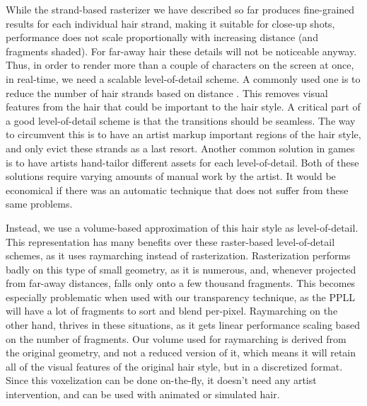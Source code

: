 \documentclass{egpubl}
\begin{document}
While the strand-based rasterizer we have described so far produces fine-grained results for each individual hair strand, making it suitable for close-up shots, performance does not scale proportionally with increasing distance (and fragments shaded). For far-away hair these details will not be noticeable anyway. Thus, in order to render more than a couple of characters on the screen at once, in real-time, we need a scalable level-of-detail scheme. A commonly used one is to reduce the number of hair strands based on distance \cite{ward2007survey}. This removes visual features from the hair that could be important to the hair style. A critical part of a good level-of-detail scheme is that the transitions should be seamless. The way to circumvent this is to have an artist markup important regions of the hair style, and only evict these strands as a last resort. Another common solution in games \cite{lacroix2013tressfx} is to have artists hand-tailor different assets for each level-of-detail. Both of these solutions require varying amounts of manual work by the artist. It would be economical if there was an automatic technique that does not suffer from these same problems.


Instead, we use a volume-based approximation of this hair style as level-of-detail. This representation has many benefits over these raster-based level-of-detail schemes, as it uses raymarching instead of rasterization. Rasterization performs badly on this type of small geometry, as it is numerous, and, whenever projected from far-away distances, falls only onto a few thousand fragments. This becomes especially problematic when used with our transparency technique, as the PPLL will have a lot of fragments to sort and blend per-pixel. Raymarching on the other hand, thrives in these situations, as it gets linear performance scaling based on the number of fragments. Our volume used for raymarching is derived from the original geometry, and not a reduced version of it, which means it will retain all of the visual features of the original hair style, but in a discretized format. Since this voxelization can be done on-the-fly, it doesn't need any artist intervention, and can be used with animated or simulated hair.

\end{document}
